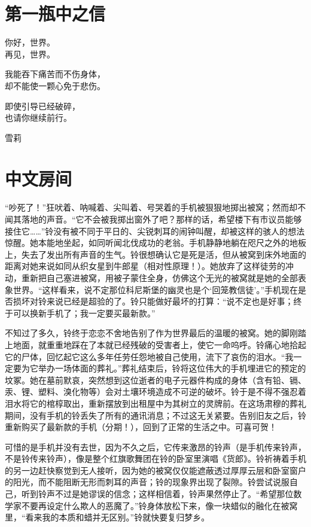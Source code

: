 %
\chapter*{第一瓶中之信}

\begingroup\kaiti\setlength{\parindent}{0pt}%
你好，世界。\\
再见，世界。\par
\halfline%
我能吞下痛苦而不伤身体，\\
却不能使一颗心免于悲伤。\par
\halfline%
即使引导已经破碎，\\
也请你继续前行。\par
\halfline\hfill%
雪莉\par
\endgroup\restoregeometry

\chapter{中文房间}
“吵死了！”狂吠着、呐喊着、尖叫着、号哭着的手机被狠狠地掷出被窝；然而却不闻其落地的声音。“它不会被我掷出窗外了吧？那样的话，希望楼下有市议员能够接住它……”铃没有被不同于平日的、尖锐刺耳的闹钟叫醒，却被这样的骇人的想法惊醒。她本能地坐起，如同听闻北伐成功的老翁。手机静静地躺在咫尺之外的地板上，失去了发出所有声音的生气。铃很想确认它是死是活，但从被窝到床外地面的距离对她来说如同从织女星到牛郎星（相对性原理！）。她放弃了这样徒劳的冲动，重新把自己塞进被窝，用被子蒙住全身，仿佛这个无光的被窝就是她的全部表象世界。“这样看来，说不定那位科尼斯堡的幽灵也是个‘回笼教信徒’。”手机现在是否损坏对铃来说已经是超验的了。铃只能做好最坏的打算：“说不定也是好事；终于可以换新手机了；我一定要买最新款。”

\begin{branch}
\gutend 不知过了多久，铃终于恋恋不舍地告别了作为世界最后的温暖的被窝。她的脚刚踏上地面，就重重地踩在了本就已经残破的受害者上，使它一命呜呼。铃痛心地拾起它的尸体，回忆起它这么多年任劳任怨地被自己使用，流下了哀伤的泪水。“我一定要为它举办一场体面的葬礼。”葬礼结束后，铃将这位伟大的手机埋进它的预定的坟冢。她在墓前默哀，突然想到这位逝者的电子元器件构成的身体（含有铅、镉、汞、锂、塑料、溴化物等）会对土壤环境造成不可逆的破坏。铃于是不得不强忍着泪水将它的棺椁取出，重新摆放到出租屋中为其树立的灵牌前。在这场肃穆的葬礼期间，没有手机的铃丢失了所有的通讯消息；不过这无关紧要。告别旧友之后，铃重新购买了最新款的手机（分期！），回到了正常的生活之中。可喜可贺！
\end{branch}

可惜的是手机并没有去世，因为不久之后，它传来激昂的铃声（是手机传来铃声，不是铃传来铃声），像是整个红旗歌舞团在铃的卧室里演唱《货郎》。铃祈祷着手机的另一边赶快察觉到无人接听，因为她的被窝仅仅能遮蔽透过厚厚云层和卧室窗户的阳光，而不能阻断无形而刺耳的声音；铃的现象界出现了裂隙。铃尝试说服自己，听到铃声不过是她谬误的信念；这样相信着，铃声果然停止了。“希望那位数学家不要再设定什么欺人的恶魔了。”铃身体放松下来，像一块蜡似的融化在被窝里，“看来我的本质和蜡并无区别。”铃就快要复归梦乡。


